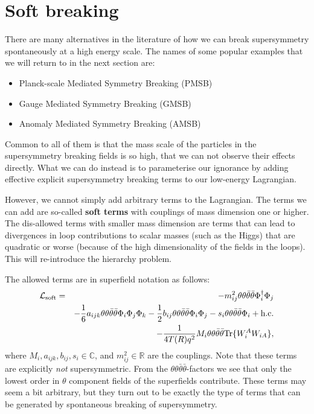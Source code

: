 \documentclass[notes.tex]{subfiles}
\begin{document}
\section[Soft breaking]{Soft breaking}
There are many alternatives in the literature of how we can break supersymmetry spontaneously at a high energy scale. The names of some popular examples that we will return to in the next section are:
\begin{itemize}
\item Planck-scale Mediated Symmetry Breaking (PMSB)
\item Gauge Mediated Symmetry Breaking (GMSB) 
\item Anomaly Mediated Symmetry Breaking (AMSB)
\end{itemize}
Common to all of them is that the mass scale of the particles in the supersymmetry breaking fields is so high, that we can not observe their effects directly. What we can do instead is to parameterise our ignorance by adding effective explicit supersymmetry breaking terms to our low-energy Lagrangian.

However, we cannot simply add arbitrary terms to the Lagrangian. The terms we can add are so-called {\bf soft terms} with couplings of mass dimension one or higher. The dis-allowed terms with smaller mass dimension are terms that can lead to divergences in loop contributions to scalar masses (such as the Higgs) that are quadratic or worse (because of the high dimensionality of the fields in the loops). This will re-introduce the hierarchy problem. 

The allowed terms are in superfield notation as follows:
\begin{eqnarray}
\mathcal{L}_{\rm soft} &=&
- m_{ij}^2 \theta\theta\bar{\theta}\bar{\theta} \Phi_i^\dagger \Phi_j  \nonumber \\
&&- \frac{1}{6}a_{ijk}\theta\theta\bar{\theta}\bar{\theta} \Phi_i\Phi_j\Phi_k -\frac{1}{2}b_{ij}\theta\theta\bar{\theta}\bar{\theta} \Phi_i \Phi_j - s_i \theta\theta\bar{\theta}\bar{\theta} \Phi_i +\text{h.c.} \label{eq:gensoftterms} \\
&& -\frac{1}{4 T(R)q^2} M_i \theta\theta\bar{\theta}\bar{\theta} {\rm Tr}\{W_i^AW_{iA} \}, \nonumber
\end{eqnarray}
where $M_i, a_{ijk}, b_{ij}, s_i\in\mathbb C$, and $m_{ij}^2\in\mathbb R$ are the couplings.
Note that these terms are explicitly {\it not} supersymmetric. From the $\theta\theta\bar{\theta}\bar{\theta}$-factors we see that only the lowest order in $\theta$ component fields of the superfields contribute. These terms may seem a bit arbitrary, but they turn out to be exactly the type of terms that can be generated by spontaneous breaking of supersymmetry.
\end{document}
